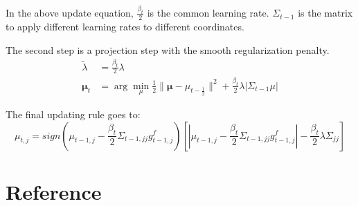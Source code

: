 \documentclass{article}
\begin{document}
In the above update equation, $\frac{\beta_t}{2}$ is the common learning rate.
$\Sigma_{t-1}$ is the matrix to apply different learning rates to different
coordinates.

The second step is a projection step with the smooth regularization penalty.
\begin{equation}
    \begin{aligned}
        \tilde{\lambda} &= \frac{\beta_t}{2} \lambda \\
        \bm{\mu}_{t} &= \arg\min_{\mu}{\frac{1}{2}\|\bm{\mu} -
        \mu_{t-\frac{1}{2}}\|^2
        + \frac{\beta_t}{2}\lambda|\Sigma_{t-1}\mu|}
    \end{aligned}
    \label{equ:08}
\end{equation}


The final updating rule goes to:
\begin{equation}
    \mu_{t,j} = sign(\mu_{t-1,j} -
    \frac{\beta_t}{2}\Sigma_{t-1,jj}g_{t-1,j}^f)
    [|\mu_{t-1,j} - \frac{\beta_t}{2}\Sigma_{t-1,jj}g_{t-1,j}^f| -
    \frac{\beta_t}{2}\lambda\Sigma_{jj}]
    \label{equ:09}
\end{equation}

\section{Reference}
\end{document}
